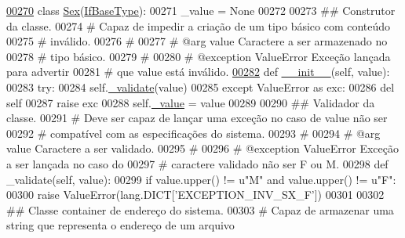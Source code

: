 \begin{DoxyCode}
\hypertarget{BaseUnit_8py_source_l00270}{}\hyperlink{classELO_1_1BaseUnit_1_1Sex}{00270} \textcolor{keyword}{class }\hyperlink{classELO_1_1BaseUnit_1_1Sex}{Sex}(\hyperlink{classELO_1_1BaseUnit_1_1IfBaseType}{IfBaseType}):
00271     \_value = \textcolor{keywordtype}{None}
00272     
00273     \textcolor{comment}{## Construtor da classe.}
00274     \textcolor{comment}{#   Capaz de impedir a criação de um tipo básico com conteúdo}
00275     \textcolor{comment}{#   inválido.}
00276     \textcolor{comment}{#}
00277     \textcolor{comment}{#   @arg        value       Caractere a ser armazenado no}
00278     \textcolor{comment}{#                           tipo básico.}
00279     \textcolor{comment}{#}
00280     \textcolor{comment}{#   @exception  ValueError  Exceção lançada para advertir}
00281     \textcolor{comment}{#                           que value está inválido.}
\hypertarget{BaseUnit_8py_source_l00282}{}\hyperlink{classELO_1_1BaseUnit_1_1Sex_a731f457d4e4ad3073497385ccd05ed80}{00282}     \textcolor{keyword}{def }\hyperlink{classELO_1_1BaseUnit_1_1Sex_a731f457d4e4ad3073497385ccd05ed80}{\_\_init\_\_}(self, value):
00283         \textcolor{keywordflow}{try}:
00284             self.\hyperlink{classELO_1_1BaseUnit_1_1IfBaseType_acf84c5906a39b605a23ab68c4ca1dd19}{\_validate}(value)
00285         \textcolor{keywordflow}{except} ValueError \textcolor{keyword}{as} exc:
00286             del self
00287             \textcolor{keywordflow}{raise} exc
00288         self.\hyperlink{classELO_1_1BaseUnit_1_1IfBaseType_ad05d9d377fc4b99743c022cc8f6019d7}{\_value} = value
00289 
00290     \textcolor{comment}{## Validador da classe.}
00291     \textcolor{comment}{#   Deve ser capaz de lançar uma exceção no caso de value não ser}
00292     \textcolor{comment}{#   compatível com as especificações do sistema.}
00293     \textcolor{comment}{#}
00294     \textcolor{comment}{#   @arg        value       Caractere a ser validado.}
00295     \textcolor{comment}{#}
00296     \textcolor{comment}{#   @exception  ValueError  Exceção a ser lançada no caso do}
00297     \textcolor{comment}{#                           caractere validado não ser F ou M.}
00298     \textcolor{keyword}{def }\_validate(self, value):
00299         \textcolor{keywordflow}{if} value.upper() != \textcolor{stringliteral}{u"M"} \textcolor{keywordflow}{and} value.upper() != \textcolor{stringliteral}{u"F"}:
00300             \textcolor{keywordflow}{raise} ValueError(lang.DICT[\textcolor{stringliteral}{'EXCEPTION\_INV\_SX\_F'}])
00301 
00302 \textcolor{comment}{## Classe container de endereço do sistema.}
00303 \textcolor{comment}{#   Capaz de armazenar uma string que representa o endereço de um arquivo}

\end{DoxyCode}
